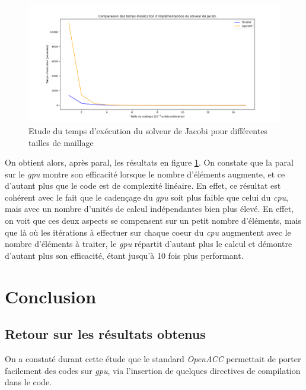 \documentclass{article}
\begin{document}
\begin{figure}[!htb]
	\centering
	\includegraphics[width=\linewidth]{Time_elts.png}  
	\caption{Etude du temps d'exécution du solveur de Jacobi pour différentes tailles de maillage}
	\label{fig:elts_acc_omp}
\end{figure}

On obtient alors, après \gls{paral}, les résultats en figure \ref{fig:elts_acc_omp}. On constate que la \gls{paral} sur le \textit{\gls{gpu}} montre son efficacité lorsque le nombre d'éléments augmente, et ce d'autant plus que le code est de complexité linéaire. En effet, ce résultat est cohérent avec le fait que le cadençage du \textit{\gls{gpu}} soit plus faible que celui du \textit{\gls{cpu}}, mais avec un nombre d'unités de calcul indépendantes bien plus élevé. En effet, on voit que ces deux aspects se compensent sur un petit nombre d'éléments, mais que là où les itérations à effectuer sur chaque \gls{coeur} du \textit{\gls{cpu}} augmentent avec le nombre d'éléments à traiter, le \textit{\gls{gpu}} répartit d'autant plus le calcul et démontre d'autant plus son efficacité, étant jusqu'à 10 fois plus performant.

\section{Conclusion}

\subsection{Retour sur les résultats obtenus}

On a constaté durant cette étude que le standard \textit{OpenACC} permettait de porter facilement des codes sur \textit{\gls{gpu}}, via l'insertion de quelques directives de compilation dans le code.
\end{document}
